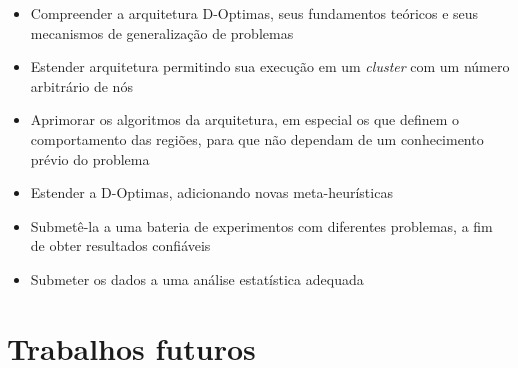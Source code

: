 \begin{itemize}
    \item Compreender a arquitetura D-Optimas, seus fundamentos teóricos e seus mecanismos de generalização de problemas
    \item Estender arquitetura permitindo sua execução em um \textit{cluster} com um número arbitrário de nós
    \item Aprimorar os algoritmos da arquitetura, em especial os que definem o comportamento das regiões, para que não dependam de um conhecimento prévio do problema 
    \item Estender a D-Optimas, adicionando novas meta-heurísticas
    \item Submetê-la a uma bateria de experimentos com diferentes problemas, a fim de obter resultados confiáveis
    \item Submeter os dados a uma análise estatística adequada 
\end{itemize}


\section{Trabalhos futuros}
